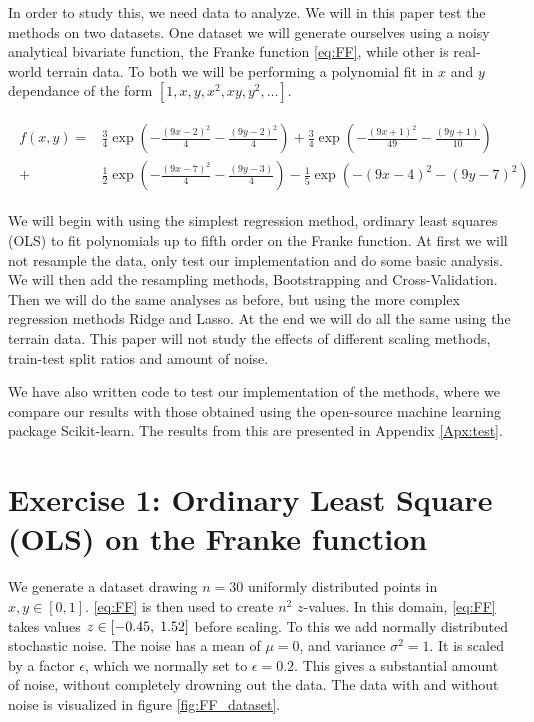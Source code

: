 \documentclass[reprint,english,notitlepage,aps,nobalancelastpage,nofootinbib]{revtex4-1}  %
\begin{document}
In order to study this, we need data to analyze. We will in this paper test the methods on two datasets. One dataset we will generate ourselves using a noisy analytical bivariate function, the Franke function \eqref{eq:FF}, while other is real-world terrain data. To both we will be performing a polynomial fit in $x$ and $y$ dependance of the form $[1, x, y, x^2, xy, y^2, \dots]$.

\begin{align}
	\begin{split}\label{eq:FF}
		f(x,y) = &\frac{3}{4}\exp(-\frac{(9x -2)^2}{4} - \frac{(9y-2)^2}{4}) + \frac{3}{4}\exp(-\frac{(9x + 1)^2}{49} - \frac{(9y + 1)}{10})
		\\
		+ &\frac{1}{2}\exp(-\frac{(9x-7)^2}{4} - \frac{(9y -3)}{4}) - \frac{1}{5}\exp(-(9x-4)^2 - (9y-7)^2)
	\end{split}
\end{align}

We will begin with using the simplest regression method, ordinary least squares (OLS) to fit polynomials up to fifth order on the Franke function. At first we will not resample the data, only test our implementation and do some basic analysis. We will then add the resampling methods, Bootstrapping and Cross-Validation. Then we will do the same analyses as before, but using the more complex regression methods Ridge and Lasso. At the end we will do all the same using the terrain data. This paper will not study the effects of different scaling methods, train-test split ratios and amount of noise.

We have also written code to test our implementation of the methods, where we compare our results with those obtained using the open-source machine learning package Scikit-learn. The results from this are presented in Appendix \ref{Apx:test}.



\section*{Exercise 1: Ordinary Least Square (OLS) on the Franke function}

We generate a dataset drawing $n=30$ uniformly distributed points in $x, y \in[0, 1]$. \eqref{eq:FF} is then used to create $n^2$ \(z\)-values. In this domain, \eqref{eq:FF} takes values \(z\in[-0.45, \hspace{1mm} 1.52]\) before scaling. To this we add normally distributed stochastic noise. The noise has a mean of $\mu=0$, and variance $\sigma^2=1$. It is scaled by a factor $\epsilon$, which we normally set to $\epsilon=0.2$. This gives a substantial amount of noise, without completely drowning out the data. The data with and without noise is visualized in figure \ref{fig:FF_dataset}.
\end{document}
